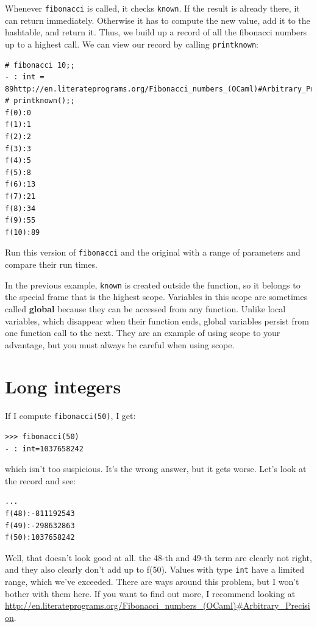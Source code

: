 \documentclass[10pt]{book}
\begin{document}
{Whenever {\tt fibonacci} is called, it checks {\tt known}.
If the result is already there, it can return
immediately.  Otherwise it has to 
compute the new value, add it to the hashtable, and return it. 
Thus, we build up a record of all the fibonacci numbers up to 
a highest call. We can view our record by calling {\tt printknown}:

\beforeverb
\begin{verbatim}
# fibonacci 10;;
- : int = 89http://en.literateprograms.org/Fibonacci_numbers_(OCaml)#Arbitrary_Precision
# printknown();;
f(0):0
f(1):1
f(2):2
f(3):3
f(4):5
f(5):8
f(6):13
f(7):21
f(8):34
f(9):55
f(10):89
\end{verbatim}
\afterverb

\begin{ex}
Run this version of {\tt fibonacci} and the original with
a range of parameters and compare their run times.
\end{ex}

In the previous example, {\tt known} is created outside the function,
so it belongs to the special frame that is the highest scope.
Variables in this scope are sometimes called {\bf global}
because they can be accessed from any function.  Unlike local
variables, which disappear when their function ends, global variables
persist from one function call to the next. They are an example of using 
scope to your advantage, but you must always be careful when using scope.

\section{Long integers}


If I compute {\tt fibonacci(50)}, I get:

\beforeverb
\begin{verbatim}
>>> fibonacci(50)
- : int=1037658242
\end{verbatim}
\afterverb
%
which isn't too suspicious. It's the wrong answer, but it gets worse. Let's look at the record 
and see:

\beforeverb
\begin{verbatim}
...
f(48):-811192543
f(49):-298632863
f(50):1037658242
\end{verbatim}
\afterverb
Well, that doesn't look good at all. the 48-th and 49-th term are clearly not right, and they also clearly don't add up to f(50). Values with type {\tt int} have a limited range, which we've exceeded. There are ways around this problem, but I won't bother with them here. If you want to find out more, I recommend looking at \url{http://en.literateprograms.org/Fibonacci_numbers_(OCaml)#Arbitrary_Precision}.

}
\end{document}
